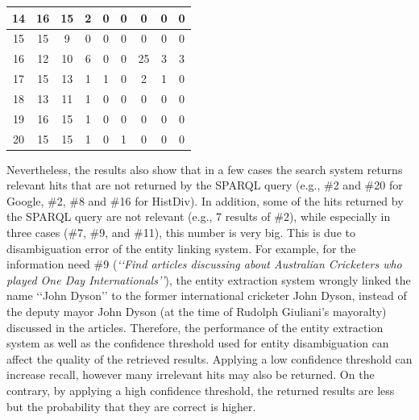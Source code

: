 \documentclass{libtex/sig-alternate-05-2015}
\newcommand{\q}[1]{\lq\lq{}{}#1\rq\rq{}{}}
\begin{document}
\begin{table}
{{\begin{tabular}{|c|c|c|c|c|c|c|c|c|}
\hline
14 & 16  & 15  & 2  & 0  & 0  & 0  & 0  & 0 \\
\hline
15 & 15  & 9  & 0  & 0  & 0  & 0  & 0  & 0 \\
\hline
16 & 12  & 10  & 6  & 0  & 0  & 25  & 3  & 3 \\
\hline
17 & 15  & 13  & 1  & 1  & 0  & 2  & 1  & 0 \\
\hline
18 & 13  & 11  & 1  & 0  & 0  & 0  & 0  & 0 \\
\hline
19 & 16  & 15  & 1  & 0  & 0  & 0  & 0  & 0 \\
\hline
20 & 15  & 15  &  1 &  0 & 1  & 0  & 0  & 0 \\
\hline
\end{tabular}}}
\vspace{-5mm}
\end{table}

Nevertheless, the results also show that in a few cases
the search system returns relevant hits that
are not returned by the SPARQL query
(e.g., \#2 and \#20 for Google, \#2, \#8 and \#16 for HistDiv).
In addition, some of the hits returned by the SPARQL query
are not relevant (e.g., 7 results of \#2),
while especially in three cases (\#7, \#9, and \#11),
this number is very big.
This is due to disambiguation error
of the entity linking system.
For example, for the information need \#9
({\em \q{Find articles discussing about Australian Cricketers
who played One Day Internationals}}),
the entity extraction system wrongly linked the name \q{John Dyson}
to the former international cricketer John Dyson,
instead of the deputy mayor John Dyson (at the time of Rudolph Giuliani's mayoralty)
discussed in the articles.
Therefore, the performance of the entity extraction system as well as
the confidence threshold used for entity disambiguation can
affect the quality  of the retrieved results.
Applying a low confidence threshold can increase recall, however
many irrelevant hits may also be returned.
On the contrary, by applying a high confidence threshold,
the returned results are less but the probability that they are correct is higher.
\end{document}
